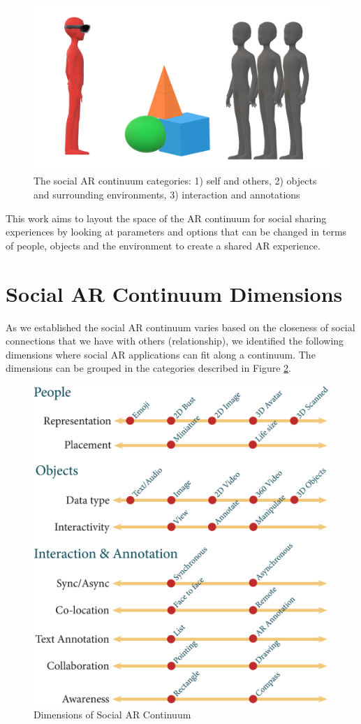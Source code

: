 \begin{figure}[h]
    \centering
    \includegraphics[width=.8\linewidth]{images/continuum_categories5.png}
    \caption{The social AR continuum categories: 1) self and others, 2) objects and surrounding environments, 3) interaction and annotations}
    \label{fig:continuum:categories}
\end{figure}


This work aims to layout the space of the AR continuum for social sharing experiences by looking at parameters and options that can be changed in terms of people, objects and the environment to create a shared AR experience.

\section{Social AR Continuum Dimensions}

As we established the social AR continuum varies based on the closeness of social connections that we have with others (relationship), we identified the following dimensions where social AR applications can fit along a continuum. The dimensions can be grouped in the categories described in Figure \ref{fig:continuum:dimensions}.

\begin{figure}[h]
    \centering
    \includegraphics[width=.8\linewidth]{images/continuum4_1.eps}
    \caption{Dimensions of Social AR Continuum}
    \label{fig:continuum:dimensions}
\end{figure}

